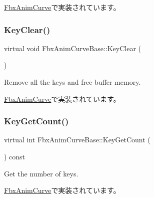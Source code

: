 \hyperlink{class_fbx_anim_curve_aefac9bf8a5d7bf1fe147e192ba503737}{Fbx\+Anim\+Curve}で実装されています。

\mbox{\label{class_fbx_anim_curve_base_abe693d293087fad223770430ec79d65d}} 
\subsubsection{\texorpdfstring{Key\+Clear()}{KeyClear()}}
{\footnotesize\ttfamily virtual void Fbx\+Anim\+Curve\+Base\+::\+Key\+Clear (\begin{DoxyParamCaption}{ }\end{DoxyParamCaption})\hspace{0.3cm}{\ttfamily [pure virtual]}}



Remove all the keys and free buffer memory. 



\hyperlink{class_fbx_anim_curve_a202883ab5e1844beb60d40137464afd8}{Fbx\+Anim\+Curve}で実装されています。

\mbox{\label{class_fbx_anim_curve_base_a36fcc14d1c1944341da57085956a3f59}} 
\subsubsection{\texorpdfstring{Key\+Get\+Count()}{KeyGetCount()}}
{\footnotesize\ttfamily virtual int Fbx\+Anim\+Curve\+Base\+::\+Key\+Get\+Count (\begin{DoxyParamCaption}{ }\end{DoxyParamCaption}) const\hspace{0.3cm}{\ttfamily [pure virtual]}}



Get the number of keys. 



\hyperlink{class_fbx_anim_curve_a08de74d6ef6469be37abd1df0836eac9}{Fbx\+Anim\+Curve}で実装されています。

\mbox{\label{class_fbx_anim_curve_base_a9db34dd56ce9822d0d6723ce7d50c4a3}} 
